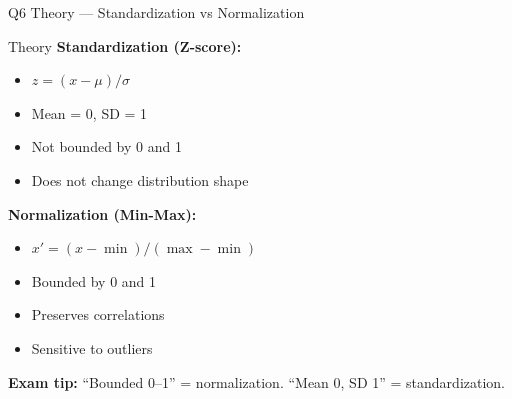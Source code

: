 \documentclass[aspectratio=169,8pt]{beamer}
\begin{document}
	\begin{frame}{Q6 Theory --- Standardization vs Normalization}
		\begin{block}{Theory}
			\textbf{Standardization (Z-score):}
			\begin{itemize}
				\item $z = (x - \mu) / \sigma$
				\item Mean = 0, SD = 1
				\item Not bounded by 0 and 1
				\item Does not change distribution shape
			\end{itemize}
			\textbf{Normalization (Min-Max):}
			\begin{itemize}
				\item $x' = (x - \min) / (\max - \min)$
				\item Bounded by 0 and 1
				\item Preserves correlations
				\item Sensitive to outliers
			\end{itemize}
			\textbf{Exam tip:} ``Bounded 0--1'' = normalization. ``Mean 0, SD 1'' = standardization.
		\end{block}
	\end{frame}
	
\end{document}
